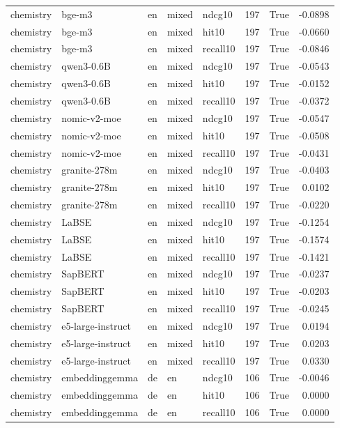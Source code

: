 \begin{tabular}{lllllrrr}
chemistry & bge-m3 & en & mixed & ndcg10 & 197 & True & -0.0898 \\
chemistry & bge-m3 & en & mixed & hit10 & 197 & True & -0.0660 \\
chemistry & bge-m3 & en & mixed & recall10 & 197 & True & -0.0846 \\
chemistry & qwen3-0.6B & en & mixed & ndcg10 & 197 & True & -0.0543 \\
chemistry & qwen3-0.6B & en & mixed & hit10 & 197 & True & -0.0152 \\
chemistry & qwen3-0.6B & en & mixed & recall10 & 197 & True & -0.0372 \\
chemistry & nomic-v2-moe & en & mixed & ndcg10 & 197 & True & -0.0547 \\
chemistry & nomic-v2-moe & en & mixed & hit10 & 197 & True & -0.0508 \\
chemistry & nomic-v2-moe & en & mixed & recall10 & 197 & True & -0.0431 \\
chemistry & granite-278m & en & mixed & ndcg10 & 197 & True & -0.0403 \\
chemistry & granite-278m & en & mixed & hit10 & 197 & True & 0.0102 \\
chemistry & granite-278m & en & mixed & recall10 & 197 & True & -0.0220 \\
chemistry & LaBSE & en & mixed & ndcg10 & 197 & True & -0.1254 \\
chemistry & LaBSE & en & mixed & hit10 & 197 & True & -0.1574 \\
chemistry & LaBSE & en & mixed & recall10 & 197 & True & -0.1421 \\
chemistry & SapBERT & en & mixed & ndcg10 & 197 & True & -0.0237 \\
chemistry & SapBERT & en & mixed & hit10 & 197 & True & -0.0203 \\
chemistry & SapBERT & en & mixed & recall10 & 197 & True & -0.0245 \\
chemistry & e5-large-instruct & en & mixed & ndcg10 & 197 & True & 0.0194 \\
chemistry & e5-large-instruct & en & mixed & hit10 & 197 & True & 0.0203 \\
chemistry & e5-large-instruct & en & mixed & recall10 & 197 & True & 0.0330 \\
chemistry & embeddinggemma & de & en & ndcg10 & 106 & True & -0.0046 \\
chemistry & embeddinggemma & de & en & hit10 & 106 & True & 0.0000 \\
chemistry & embeddinggemma & de & en & recall10 & 106 & True & 0.0000 \\

\end{tabular}
